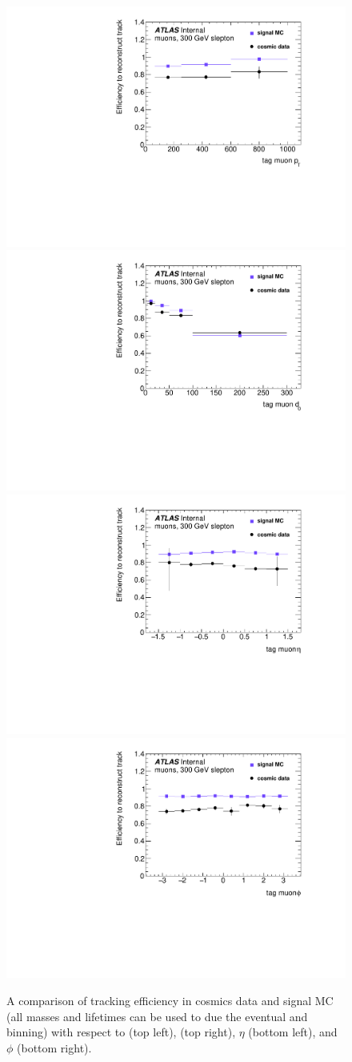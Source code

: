\begin{figure}[htbp]
\centering
\includegraphics[width=.48\textwidth]{figures/LRT_systs/compare_pt_z0120_Rgd0_timing_idcuts.pdf}
\includegraphics[width=.48\textwidth]{figures/LRT_systs/compare_d0_z0120_Rgd0_timing_idcuts.pdf}
\includegraphics[width=.48\textwidth]{figures/LRT_systs/compare_eta_z0120_Rgd0_timing_idcuts.pdf}
\includegraphics[width=.48\textwidth]{figures/LRT_systs/compare_phi_z0120_Rgd0_timing_idcuts.pdf}
\caption{A comparison of tracking efficiency in cosmics data and signal MC (all masses and lifetimes can be used to due the eventual \pt and \dz binning) with respect to \pt (top left), \dz (top right), $\eta$ (bottom left), and $\phi$ (bottom right).}
\label{fig:lrt_eff_comp}
\end{figure}

